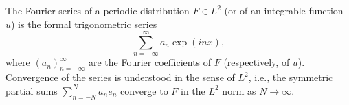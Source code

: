 The Fourier series of a periodic distribution $F \in L^2$ (or of an integrable function $u$) is the formal trigonometric series
$$\sum_{n=-\infty}^{\infty} a_n \exp(inx),$$
where $(a_n)_{n=-\infty}^{\infty}$ are the Fourier coefficients of $F$ (respectively, of $u$). Convergence of the series is understood in the sense of $L^2$, i.e., the symmetric partial sums $\sum_{n=-N}^{N} a_n e_n$ converge to $F$ in the $L^2$ norm as $N \to \infty$.

